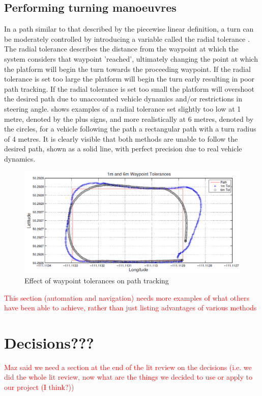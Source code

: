 \documentclass[main.tex]{subfiles}
\begin{document}
\subsection{Performing turning manoeuvres}
In a path similar to that described by the piecewise linear definition, a turn can be moderately controlled by introducing a variable called the radial tolerance \parencite{Giesbrecht2005}. The radial tolerance describes the distance from the waypoint at which the system considers that waypoint 'reached', ultimately changing the point at which the platform will begin the turn towards the proceeding waypoint. If the radial tolerance is set too large the platform will begin the turn early resulting in poor path tracking. If the radial tolerance is set too small the platform will overshoot the desired path due to unaccounted vehicle dynamics and/or restrictions in steering angle.  shows examples of a radial tolerance set slightly too low at 1 metre, denoted by the plus signs, and more realistically at 6 metres, denoted by the circles, for a vehicle following the path a rectangular path with a turn radius of 4 metres. It is clearly visible that both methods are unable to follow the desired path, shown as a solid line, with perfect precision due to real vehicle dynamics.
\begin{figure}[ht]
\includegraphics[width=\textwidth]{2-LiteratureReview/waypointTolerances.PNG}
\centering
\caption[Effect of waypoint tolerances on path tracking]{Effect of waypoint tolerances on path tracking \parencite{Giesbrecht2005}} 
\end{figure}

\textcolor{red}{This section (automation and navigation) needs more examples of what others have been able to achieve, rather than just listing advantages of various methods}
\section{Decisions???}
\textcolor{red}{Maz said we need a section at the end of the lit review on the decisions (i.e. we did the whole lit review, now what are the things we decided to use or apply to our project (I think?))}
\end{document}
